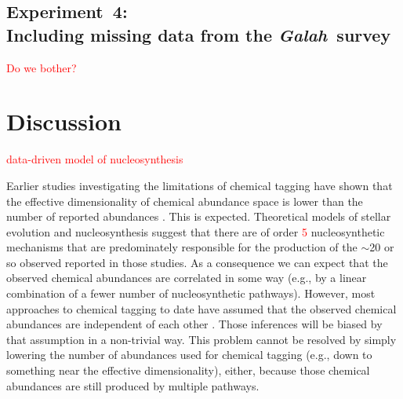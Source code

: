 \documentclass[twocolumn]{aastex62}
\newcommand{\project}[1]{\textsl{#1}}
\newcommand{\Galah}{\project{Galah}}
\newcommand{\todo}[1]{\textcolor{red}{#1}}
\begin{document}
\subsection{Experiment~4:\\Including missing data from the \Galah\ survey} \label{sec:experiment-4}

\todo{Do we bother?}

\section{Discussion} \label{sec:discussion}

\todo{data-driven model of nucleosynthesis}


Earlier studies investigating the limitations of chemical tagging have shown
that the effective dimensionality of chemical abundance space is lower than
the number of reported abundances \citep[e.g.,][]{Ting:2012,Price-Jones:2018}. 
This is expected. Theoretical models of stellar evolution and nucleosynthesis 
suggest that there are of order \todo{5} nucleosynthetic mechanisms that are
predominately responsible for the production of the $\sim$20 or so observed 
reported in those studies. As a consequence we can expect that the observed
chemical abundances are correlated in some way (e.g., by a linear combination
of a fewer number of nucleosynthetic pathways).  However, most approaches to
chemical tagging to date have assumed that the observed chemical abundances
are independent of each other \todo{\citep[e.g.,][]{who}}. Those inferences
will be biased by that assumption in a non-trivial way. This problem cannot be
resolved by simply lowering the number of abundances used for chemical tagging (e.g.,
down to something near the effective dimensionality), either, because those
chemical abundances are still produced by multiple pathways.
\end{document}
